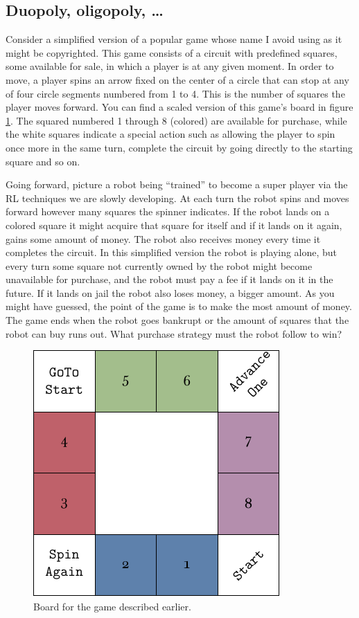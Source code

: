 \subsection{Duopoly, oligopoly, \ldots}
Consider a simplified version of a popular game whose name I 
avoid using as it might be copyrighted. This game consists of a 
circuit with predefined squares, some available for sale, in 
which a player is at any given moment. In order to move, a 
player spins an arrow fixed on the center of a circle that can 
stop at any of four circle segments numbered from 1 to 4. This 
is the number of squares the player moves forward. You can find 
a scaled version of this game's board in figure 
\ref{fig:miniopoly-board}. The squared numbered 1 through 8 
(colored) are available for purchase, while the white squares 
indicate a special action such as allowing the player to spin 
once more in the same turn, complete the circuit by going 
directly to the starting square and so on.

Going forward, picture a robot being ``trained'' to become a 
super player via the RL techniques we are slowly developing. At 
each turn the robot spins and moves forward however many 
squares the spinner indicates. If the robot lands on a colored 
square it might acquire that square for itself and if it lands 
on it again, gains some amount of money. The robot also 
receives money every time it completes the circuit. In this 
simplified version the robot is playing alone, but every turn 
some square not currently owned by the robot might become 
unavailable for purchase, and the robot must pay a fee if it 
lands on it in the future. If it lands on jail the robot also 
loses money, a bigger amount. As you might have guessed, the 
point of the game is to make the most amount of money. The game 
ends when the robot goes bankrupt or the amount of squares that 
the robot can buy runs out. What purchase strategy must the 
robot follow to win?
\begin{figure}[H]
	\centering
	\includegraphics[width=.65\textwidth]{img/board.pdf}
	\caption{Board for the game described earlier.}
	\label{fig:miniopoly-board}
\end{figure}

